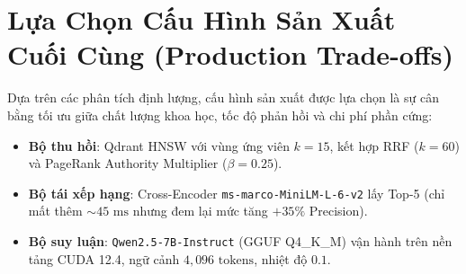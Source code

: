 \section{Lựa Chọn Cấu Hình Sản Xuất Cuối Cùng (Production Trade-offs)}

Dựa trên các phân tích định lượng, cấu hình sản xuất được lựa chọn là sự cân bằng tối ưu giữa chất lượng khoa học, tốc độ phản hồi và chi phí phần cứng:
\begin{itemize}
  \item \textbf{Bộ thu hồi}: Qdrant HNSW với vùng ứng viên $k=15$, kết hợp RRF ($k=60$) và PageRank Authority Multiplier ($\beta=0.25$).
  \item \textbf{Bộ tái xếp hạng}: Cross-Encoder \texttt{ms-marco-MiniLM-L-6-v2} lấy Top-5 (chỉ mất thêm $\sim 45\text{ ms}$ nhưng đem lại mức tăng $+35\%$ Precision).
  \item \textbf{Bộ suy luận}: \texttt{Qwen2.5-7B-Instruct} (GGUF Q4\_K\_M) vận hành trên nền tảng CUDA 12.4, ngữ cảnh $4,096\text{ tokens}$, nhiệt độ $0.1$.
\end{itemize}
